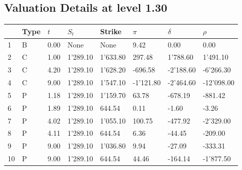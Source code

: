 \documentclass[12pt]{article}
\begin{document}
\begin{center} 
 \subsection{Valuation Details at level 1.30} 
 \par 
 \begin{scriptsize} 
 \begin{tabular}{p{13.1 mm}|p{13.1 mm}|p{13.1 mm}|p{13.1 mm}|p{13.1 mm}|p{13.1 mm}|p{13.1 mm}|p{13.1 mm}} 
          &     Type &      $t$ &    $S_t$ &   Strike &    $\pi$ & $\delta$ &   $\rho$ \\ \hline 
1 & B& 0.00& None& None& 9.42& 0.00& 0.00\\ 
2 & C& 1.00& 1'289.10& 1'633.80& 297.48& 1'788.60& 1'491.10\\ 
3 & C& 4.20& 1'289.10& 1'628.20& -696.58& -2'188.60& -6'266.30\\ 
4 & C& 9.00& 1'289.10& 1'547.10& -1'121.80& -2'464.60& -12'098.00\\ 
5 & P& 1.18& 1'289.10& 1'159.70& 63.78& -678.19& -881.42\\ 
6 & P& 1.89& 1'289.10& 644.54& 0.11& -1.60& -3.26\\ 
7 & P& 4.02& 1'289.10& 1'055.10& 100.75& -477.92& -2'329.00\\ 
8 & P& 4.11& 1'289.10& 644.54& 6.36& -44.45& -209.00\\ 
9 & P& 9.00& 1'289.10& 1'036.80& 9.94& -27.09& -333.31\\ 
10 & P& 9.00& 1'289.10& 644.54& 44.46& -164.14& -1'877.50\\ 
\end{tabular} 
  \end{scriptsize} 
 \end{center}%
\end{document}
